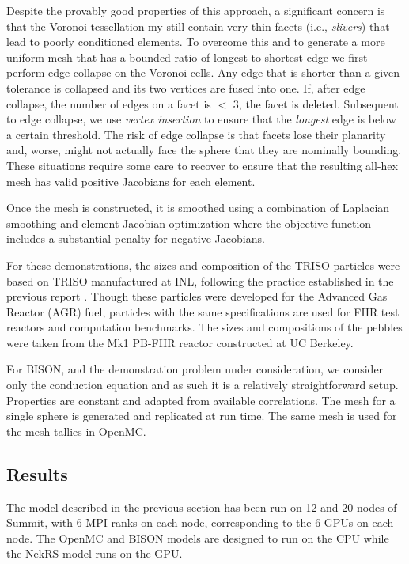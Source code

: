Despite the provably good properties of this approach, a significant concern is that the Voronoi tessellation my still contain very thin facets (i.e., {\em slivers}) that lead to poorly conditioned elements.
To overcome this and to generate a more uniform mesh that has a bounded ratio of longest to shortest edge we first perform edge collapse on the Voronoi cells.
Any edge that is shorter than a given tolerance is collapsed and its two vertices are fused into one.
If, after edge collapse, the number of edges on a facet is $<$ 3, the facet is deleted.
Subsequent to edge collapse, we use {\em vertex insertion} to ensure that the {\em longest} edge is below a certain threshold.
The risk of edge collapse is that facets lose their planarity and, worse, might not actually face the sphere that they are nominally bounding.
These situations require some care to recover to ensure that the resulting all-hex mesh has valid positive Jacobians for each element.

Once the mesh is constructed, it is smoothed using a combination of Laplacian smoothing and element-Jacobian optimization where the objective function
includes a substantial penalty for negative Jacobians.

For these demonstrations, the sizes and composition of the TRISO particles were based on TRISO manufactured at INL, following the practice established in the previous report \cite{cardinal}.
Though these particles were developed for the Advanced Gas Reactor (AGR) fuel, particles with the same specifications are used for FHR test reactors and computation benchmarks.
The sizes and compositions of the pebbles were taken from the Mk1 PB-FHR reactor constructed at UC Berkeley.

For BISON, and the demonstration problem under consideration, we consider only the conduction equation and as such it is a relatively straightforward setup.
Properties are constant and adapted from available correlations.
The mesh for a single sphere is generated and replicated at run time.
The same mesh is used for the mesh tallies in OpenMC.

\subsection{Results}

The model described in the previous section has been run on 12 and 20 nodes of Summit, with 6 MPI ranks on each node, corresponding to the 6 GPUs on each node.
The OpenMC and BISON models are designed to run on the CPU while the NekRS model runs on the GPU.

